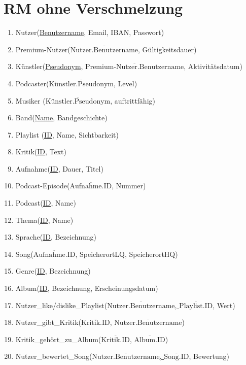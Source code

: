 \documentclass[a4paper,11pt]{article}
\begin{document}
\printheader




\section*{RM ohne Verschmelzung}
\begin{enumerate}
    \item Nutzer(\underline{Benutzername}, Email, IBAN, Passwort)
    \item Premium-Nutzer(\underline{$\overline{\text{Nutzer.Benutzername}}$}, Gültigkeitsdauer)
    \item Künstler(\underline{Pseudonym}, $\overline{\text{Premium-Nutzer.Benutzername}}$, Aktivitätsdatum)
    \item Podcaster(\underline{$\overline{\text{Künstler.Pseudonym}}$}, Level)
    \item Musiker (\underline{$\overline{\text{Künstler.Pseudonym}}$}, auftrittfähig)
    \item Band(\underline{Name}, Bandgeschichte)
    \item Playlist (\underline{ID}, Name, Sichtbarkeit)
    \item Kritik(\underline{ID}, Text)
    \item Aufnahme(\underline{ID}, Dauer, Titel)
    \item Podcast-Episode(\underline{$\overline{\text{Aufnahme.ID}}$}, Nummer)
    \item Podcast(\underline{ID}, Name)
    \item Thema(\underline{ID}, Name)
    \item Sprache(\underline{ID}, Bezeichnung)
    \item Song(\underline{$\overline{\text{Aufnahme.ID}}$}, SpeicherortLQ, SpeicherortHQ)
    \item Genre(\underline{ID}, Bezeichnung)
    \item Album(\underline{ID}, Bezeichnung, Erscheinungsdatum)
    \item Nutzer\_like/dislike\_Playlist(\underline{$\overline{\text{Nutzer.Benutzername}}$, $\overline{\text{Playlist.ID}}$}, Wert)
    \item Nutzer\_gibt\_Kritik(\underline{$\overline{\text{Kritik.ID}}$}, $\overline{\text{Nutzer.Benutzername}}$)
    \item Kritik\_gehört\_zu\_Album(\underline{$\overline{\text{Kritik.ID}}$}, $\overline{\text{Album.ID}}$)
    \item Nutzer\_bewertet\_Song(\underline{$\overline{\text{Nutzer.Benutzername}}$, $\overline{\text{Song.ID}}$}, Bewertung)

\end{enumerate}
\end{document}
